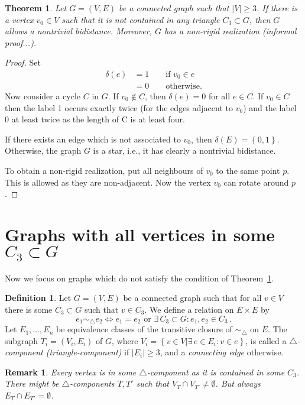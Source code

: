 \documentclass[a4paper, 11pt]{article}
\newcommand{\trcomp}{$\triangle$-component}
\newcommand{\trcomps}{$\triangle$-components}
\newtheorem{thm}{Theorem}[section]
\newtheorem*{rem}{Remark}
\theoremstyle{definition}
\newtheorem{defn}{Definition}[section]
\begin{document}
\begin{thm}
\label{thm:vertexNotInTriangle}
Let $G=(V,E)$ be a connected graph such that $|V|\geq 3$. If there is a vertex $v_0 \in V$ such that it is not contained in any triangle $C_3\subset G$, then $G$ allows a nontrivial bidistance. Moreover, $G$ has a non-rigid realization (informal proof...).
\end{thm}
\begin{proof}
Set
\begin{align*}
\delta(e)&=1 \qquad \text{if } v_0 \in e \\
		&=0 \qquad \text{otherwise.}
\end{align*} 
Now consider a cycle $C$ in $G$. If $v_0\notin C$, then $\delta(e)=0$ for all $e\in C$. If $v_0\in C$ then the label 1 occurs exactly twice (for the edges adjacent to $v_0$) and the label 0 at least twice as the length of C is at least four.

If there exists an edge which is not associated to $v_0$, then $\delta(E)=\left\{0,1\right\}$. Otherwise, the graph $G$ is a star, i.e., it has clearly a nontrivial bidistance.

To obtain a non-rigid realization, put all neighbours of $v_0$ to the same point $p$. This is allowed as they are non-adjacent. Now the vertex $v_0$ can rotate around $p$.
\end{proof}

\section{Graphs with all vertices in some $C_3\subset G$}
Now we focus on graphs which do not satisfy the condition of Theorem~\ref{thm:vertexNotInTriangle}.
 

\begin{defn}
Let $G=(V,E)$ be a connected graph such that for all $v\in V$ there is some $C_3\subset G$ such that $v\in C_3$. We define a relation on $E\times E$ by 
$$e_1 \sim_{\!\!\bigtriangleup} e_2 \iff e_1=e_2 \text{ or } \exists\, C_3\subset G: e_1, e_2\in C_3\,.$$
Let $E_1, \dots, E_n$ be equivalence classes of the transitive closure of $\sim_{\!\!\bigtriangleup}$ on $E$. The subgraph $T_i=(V_i,E_i)$ of $G$, where  $V_i=\left\{v\in V | \exists\, e\in E_i \colon v\in e\right\}$, is called a \emph{\trcomp{} (triangle-component)} if $|E_i|\geq 3$, and a \emph{connecting edge} otherwise.
\end{defn}

\begin{rem}
Every vertex is in some \trcomp{} as it is contained in some $C_3$. There might be \trcomps{} $T,T'$ such that $V_T \cap V_{T'}\neq \emptyset$. But always $E_T \cap E_{T'}= \emptyset$.
\end{rem}
\end{document}
